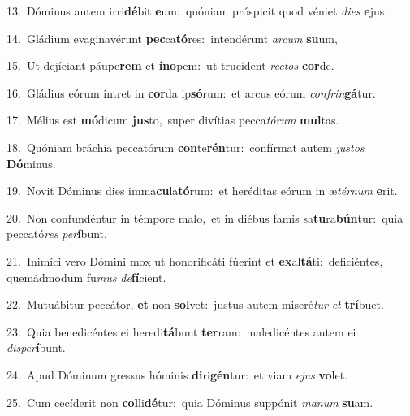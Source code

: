 {\numbfont\textcolor{\numbcolor}{13.}}~Dóminus autem irri\-\textbf{dé}\-bit \textbf{e}\-um:~\star quóniam próspicit quod véniet \textit{di}\-\textit{es} \textbf{e}\-jus.\par
{\numbfont\textcolor{\numbcolor}{14.}}~Gládium evaginavérunt \textbf{pec}\-ca\-\textbf{tó}\-res:~\star intendérunt \textit{ar}\-\textit{cum} \textbf{su}\-um,\par
{\numbfont\textcolor{\numbcolor}{15.}}~Ut dejíciant páupe\textbf{rem} et \textbf{ín}\-\textbf{o}pem:~\star ut trucídent \textit{rec}\-\textit{tos} \textbf{cor}\-de.\par
{\numbfont\textcolor{\numbcolor}{16.}}~Gládius eórum intret in \textbf{cor}\-da ip\-\textbf{só}\-rum:~\star et arcus eórum \textit{con}\-\textit{frin}\textbf{gá}tur.\par
{\numbfont\textcolor{\numbcolor}{17.}}~Mélius est \textbf{mó}\-dicum \textbf{jus}\-to,~\star super divítias pecca\-\textit{tó}\-\textit{rum} \textbf{mul}\-tas.\par
{\numbfont\textcolor{\numbcolor}{18.}}~Quóniam bráchia peccatórum \textbf{con}\-te\-\textbf{rén}\-tur:~\star confírmat autem \textit{jus}\-\textit{tos} \textbf{Dó}\-minus.\par
{\numbfont\textcolor{\numbcolor}{19.}}~Novit Dóminus dies imma\-\textbf{cu}\-la\-\textbf{tó}\-rum:~\star et heréditas eórum in æ\-\textit{tér}\-\textit{num} \textbf{e}\-rit.\par
{\numbfont\textcolor{\numbcolor}{20.}}~Non confundéntur in témpore malo,~\dagger et in diébus famis sa\-\textbf{tu}\-ra\-\textbf{bún}\-tur:~\star quia peccató\textit{res} \textit{per}\-\textbf{í}bunt.\par
{\numbfont\textcolor{\numbcolor}{21.}}~Inimíci vero Dómini mox ut honorificáti fúerint et \textbf{ex}\-al\-\textbf{tá}\-ti:~\star deficiéntes, quemádmodum fu\textit{mus} \textit{de}\-\textbf{fí}cient.\par
{\numbfont\textcolor{\numbcolor}{22.}}~Mutuábitur peccátor, \textbf{et} non \textbf{sol}\-vet:~\star justus autem miseré\textit{tur} \textit{et} \textbf{trí}\-buet.\par
{\numbfont\textcolor{\numbcolor}{23.}}~Quia benedicéntes ei heredi\-\textbf{tá}\-bunt \textbf{ter}\-ram:~\star maledicéntes autem ei \textit{dis}\-\textit{per}\textbf{í}bunt.\par
{\numbfont\textcolor{\numbcolor}{24.}}~Apud Dóminum gressus hóminis \textbf{di}\-ri\-\textbf{gén}\-tur:~\star et viam \textit{e}\-\textit{jus} \textbf{vo}\-let.\par
{\numbfont\textcolor{\numbcolor}{25.}}~Cum cecíderit non \textbf{col}\-li\-\textbf{dé}\-tur:~\star quia Dóminus suppónit \textit{ma}\-\textit{num} \textbf{su}\-am.\par
